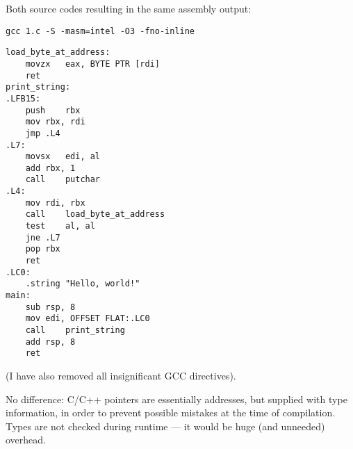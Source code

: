 Both source codes resulting in the same assembly output:

\begin{lstlisting}
gcc 1.c -S -masm=intel -O3 -fno-inline
\end{lstlisting}

\begin{lstlisting}
load_byte_at_address:
	movzx	eax, BYTE PTR [rdi]
	ret
print_string:
.LFB15:
	push	rbx
	mov	rbx, rdi
	jmp	.L4
.L7:
	movsx	edi, al
	add	rbx, 1
	call	putchar
.L4:
	mov	rdi, rbx
	call	load_byte_at_address
	test	al, al
	jne	.L7
	pop	rbx
	ret
.LC0:
	.string	"Hello, world!"
main:
	sub	rsp, 8
	mov	edi, OFFSET FLAT:.LC0
	call	print_string
	add	rsp, 8
	ret
\end{lstlisting}

(I have also removed all insignificant GCC directives).

No difference: C/C++ pointers are essentially addresses, but supplied with type information, in order to prevent possible mistakes at the time of compilation.
Types are not checked during runtime --- it would be huge (and unneeded) overhead.

